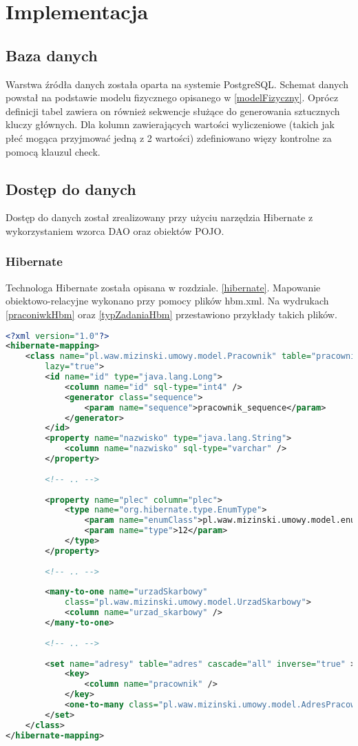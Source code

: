 \chapter{Implementacja}
\label{chap6}

\section{Baza danych}
Warstwa źródła danych została oparta na systemie PostgreSQL. Schemat danych powstał na podstawie modelu fizycznego opisanego w \ref{modelFizyczny}. Oprócz definicji tabel zawiera on również sekwencje służące do generowania sztucznych kluczy głównych. Dla kolumn zawierających wartości wyliczeniowe (takich jak płeć mogąca przyjmować jedną z 2 wartości) zdefiniowano więzy kontrolne za pomocą klauzul check.

\section{Dostęp do danych}
Dostęp do danych został zrealizowany przy użyciu narzędzia Hibernate z wykorzystaniem wzorca DAO oraz obiektów POJO.

\subsection[Hibernate][Hibernate]{Hibernate} 
Technologa Hibernate została opisana w rozdziale. \ref{hibernate}. Mapowanie obiektowo-relacyjne wykonano przy pomocy plików hbm.xml. Na wydrukach \ref{praconiwkHbm} oraz \ref{typZadaniaHbm} przestawiono przykłady takich plików.



\begin{lstlisting}[language=XML,style=outcode,showstringspaces=false,caption=Przykład pliku mapującego Hibernate,label={praconiwkHbm}]
<?xml version="1.0"?>
<hibernate-mapping>
	<class name="pl.waw.mizinski.umowy.model.Pracownik" table="pracownik"
		lazy="true">
		<id name="id" type="java.lang.Long">
			<column name="id" sql-type="int4" />
			<generator class="sequence">
				<param name="sequence">pracownik_sequence</param>
			</generator>
		</id>
		<property name="nazwisko" type="java.lang.String">
			<column name="nazwisko" sql-type="varchar" />
		</property>
		
		<!-- .. -->
		
		<property name="plec" column="plec">
			<type name="org.hibernate.type.EnumType">
				<param name="enumClass">pl.waw.mizinski.umowy.model.enums.Plec</param>
				<param name="type">12</param>
			</type>
		</property>
		
		<!-- .. -->
		
		<many-to-one name="urzadSkarbowy"
			class="pl.waw.mizinski.umowy.model.UrzadSkarbowy">
			<column name="urzad_skarbowy" />
		</many-to-one>
		
		<!-- .. -->
		
		<set name="adresy" table="adres" cascade="all" inverse="true" >
         	<key>
                <column name="pracownik" />
            </key>
            <one-to-many class="pl.waw.mizinski.umowy.model.AdresPracownika" />
        </set>
	</class>
</hibernate-mapping>
\end{lstlisting}

